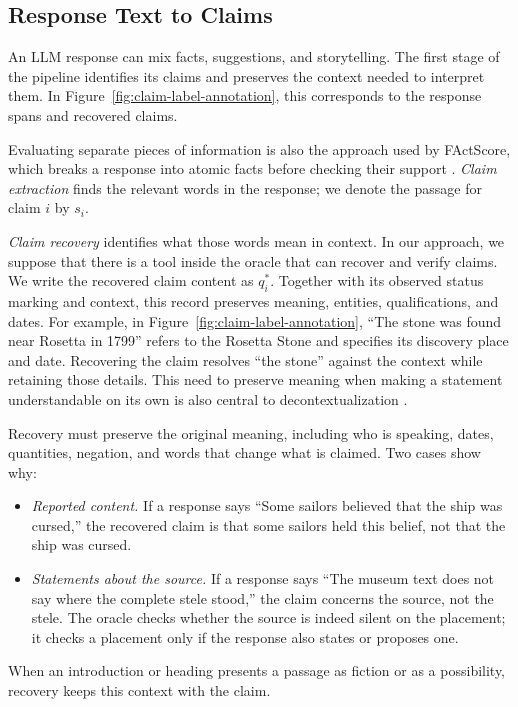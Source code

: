 \documentclass{clv2025}
\begin{document}
\subsection{Response Text to Claims}\label{subsec:unit}

An LLM response can mix facts, suggestions, and storytelling. The first
stage of the pipeline identifies its claims and preserves the context
needed to interpret them. In Figure~\ref{fig:claim-label-annotation}, this
corresponds to the response spans and recovered claims.

Evaluating separate pieces of information is also the approach used by
FActScore, which breaks a response into atomic facts before checking their
support \citep{min_factscore_2023}. \emph{Claim extraction} finds the relevant
words in the response; we denote the passage for claim $i$ by $s_i$.

\emph{Claim recovery} identifies what those words mean in context. In our approach, we suppose that there is a tool inside the oracle that can recover and verify claims.  We write
the recovered claim content as $q_i^*$. Together with its observed status
marking and context, this record preserves meaning, entities, qualifications,
and dates. For example, in
Figure~\ref{fig:claim-label-annotation}, ``The stone was found near Rosetta
in 1799'' refers to the Rosetta Stone and specifies its discovery place and
date. Recovering the claim resolves ``the stone'' against the context while
retaining those details. This need to preserve meaning when making a
statement understandable on its own is also central to decontextualization
\citep{choi_decontextualization_2021}.

Recovery must preserve the original meaning, including who is speaking,
dates, quantities, negation, and words that change what is claimed. Two
cases show why:
\begin{itemize}
\item \emph{Reported content.} If a response says ``Some sailors believed
that the ship was cursed,'' the recovered claim is that some sailors held
this belief, not that the ship was cursed.
\item \emph{Statements about the source.} If a response says ``The museum
text does not say where the complete stele stood,'' the claim concerns the
source, not the stele. The oracle checks whether the source is indeed
silent on the placement; it checks a placement only if the response also
states or proposes one.
\end{itemize}
When an introduction or heading presents a passage as fiction or as a
possibility, recovery keeps this context with the claim.
\end{document}
